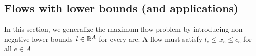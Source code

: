 \subsection{Flows with lower bounds (and applications)}
In this section, we generalize the maximum flow problem by introducing non-negative lower bounds $l \in \mathbb{R}^A$ for every arc.
A flow must satisfy $l_e \leq x_e \leq c_e$ for all $e \in A$